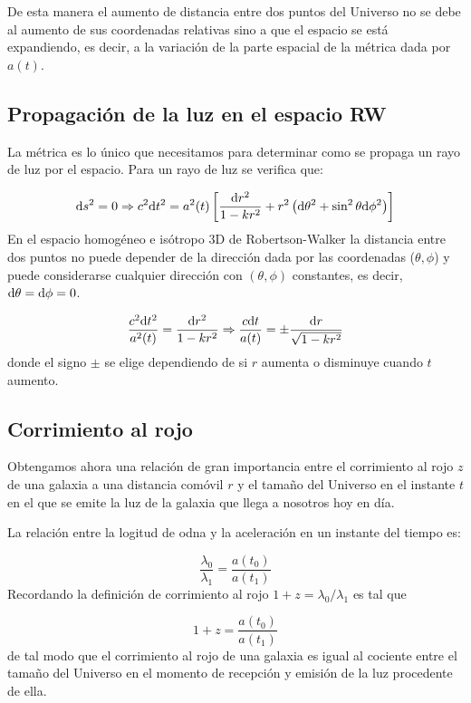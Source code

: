 De esta manera el aumento de distancia entre dos puntos del Universo no se debe al aumento de sus coordenadas relativas sino a que el espacio se está expandiendo, es decir, a la variación de la parte espacial de la métrica dada por $a(t)$.

\subsection{Propagación de la luz en el espacio RW}

La métrica es lo único que necesitamos para determinar como se propaga un rayo de luz por el espacio. Para un rayo de luz se verifica que:

\begin{equation}
	\mathrm{d} s^2 = 0  \Rightarrow c^2 \mathrm{d} t^2 = a^2(t) \left[ \frac{\mathrm{d} r^2}{1-kr^2}+r^2 \left( \mathrm{d} \theta^2 + \sin^2 \theta \mathrm{d} \phi^2 \right) \right]
\end{equation}
En el espacio homogéneo e isótropo 3D de Robertson-Walker la distancia entre dos puntos no puede depender de la dirección dada por las coordenadas ($\theta,\phi$) y puede considerarse cualquier dirección con $(\theta,\phi)$ constantes, es decir, $\mathrm{d} \theta = \mathrm{d} \phi = 0$.

\begin{equation}
	\frac{c^2 \mathrm{d} t^2}{a^2(t)} = \frac{\mathrm{d} r^2}{1-kr^2} \Rightarrow  \frac{c \mathrm{d}  t}{a(t)} = \pm\frac{\mathrm{d} r}{\sqrt{1-kr^2}}
\end{equation}
donde el signo $\pm$ se elige dependiendo de si $r$ aumenta o disminuye cuando $t$ aumento.


\subsection{Corrimiento al rojo}

Obtengamos ahora una relación de gran importancia entre el corrimiento al rojo $z$ de una galaxia a una distancia comóvil $r$ y el tamaño del Universo en el instante $t$ en el que se emite la luz de la galaxia que llega a nosotros hoy en día.

La relación entre la logitud de odna y la aceleración en un instante del tiempo es:


\begin{equation}
	\frac{\lambda_0}{\lambda_1} = \frac{a(t_0)}{a(t_1)}
\end{equation}
Recordando la definición de corrimiento al rojo $1+z=\lambda_0/\lambda_1$ es tal que

\begin{equation}
	1 + z = \frac{a(t_0)}{a(t_1)}
\end{equation}
de tal modo que el corrimiento al rojo de una galaxia es igual al cociente entre el tamaño del Universo en el momento de recepción y emisión de la luz procedente de ella.

